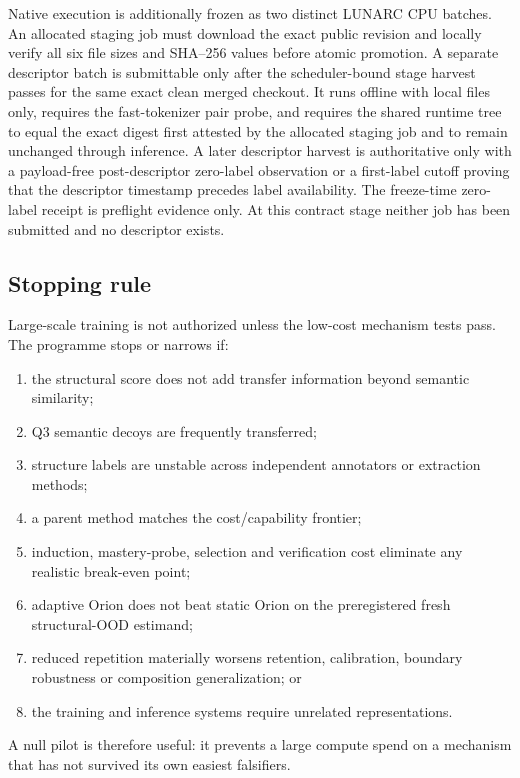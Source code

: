 Native execution is additionally frozen as two distinct LUNARC CPU batches. An
allocated staging job must download the exact public revision and locally verify
all six file sizes and SHA--256 values before atomic promotion. A separate
descriptor batch is submittable only after the scheduler-bound stage harvest
passes for the same exact clean merged checkout. It runs offline with local
files only, requires the fast-tokenizer pair probe, and requires the shared
runtime tree to equal the exact digest first attested by the allocated staging
job and to remain unchanged through inference. A later descriptor harvest is
authoritative only with a payload-free post-descriptor zero-label observation or
a first-label cutoff proving that the descriptor timestamp precedes label
availability. The freeze-time zero-label receipt is preflight evidence only. At
this contract stage neither job has been submitted and no descriptor exists.

\subsection{Stopping rule}

Large-scale training is not authorized unless the low-cost mechanism tests pass. The programme stops or narrows if:
\begin{enumerate}[leftmargin=*]
\item the structural score does not add transfer information beyond semantic similarity;
\item Q3 semantic decoys are frequently transferred;
\item structure labels are unstable across independent annotators or extraction methods;
\item a parent method matches the cost/capability frontier;
\item induction, mastery-probe, selection and verification cost eliminate any realistic break-even point;
\item adaptive Orion does not beat static Orion on the preregistered fresh structural-OOD estimand;
\item reduced repetition materially worsens retention, calibration, boundary robustness or composition generalization; or
\item the training and inference systems require unrelated representations.
\end{enumerate}

A null pilot is therefore useful: it prevents a large compute spend on a mechanism that has not survived its own easiest falsifiers.

